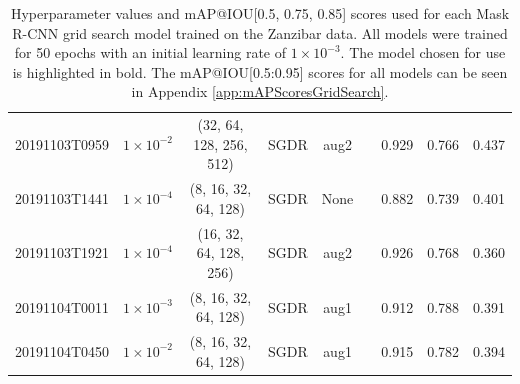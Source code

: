 \begin{table}[!ht]
\begin{adjustbox}{width=\columnwidth, center}
\begin{tabular}{ccccccccc}
			20191103T0959                        & $1\times10^{-2}$                                   & (32, 64, 128, 256, 512)                     & SGDR                                & aug2                                                                                      & \cmark                                                                                     & 0.929          & 0.766          & 0.437          \\
			20191103T1441                        & $1\times10^{-4}$                                 & (8, 16, 32, 64, 128)                        & SGDR                                & None                                                                                      & \cmark                                                                                     & 0.882          & 0.739          & 0.401          \\
			20191103T1921                        & $1\times10^{-4}$                                 & (16, 32, 64, 128, 256)                      & SGDR                                & aug2                                                                                      & \cmark                                                                                     & 0.926          & 0.768          & 0.360          \\
			20191104T0011                        & $1\times10^{-3}$                                  & (8, 16, 32, 64, 128)                        & SGDR                                & aug1                                                                                      & \cmark                                                                                     & 0.912          & 0.788          & 0.391          \\
			20191104T0450                        & $1\times10^{-2}$                                   & (8, 16, 32, 64, 128)                        & SGDR                                & aug1                                                                                      & \cmark                                                                                     & 0.915          & 0.782          & 0.394          \\ \hline
		\end{tabular}
	\end{adjustbox}
	\caption[Hyperparameter values and mAP@IOU{[}0.5, 0.75, 0.85{]} scores used for each Mask R-CNN grid search model trained on the Zanzibar data.]{Hyperparameter values and mAP@IOU{[}0.5, 0.75, 0.85{]} scores used for each Mask R-CNN grid search model trained on the Zanzibar data. All models were trained for 50 epochs with an initial learning rate of $1\times10^{-3}$. The model chosen for use is highlighted in bold. The mAP@IOU{[}0.5:0.95{]} scores for all models can be seen in Appendix \ref{app:mAPScoresGridSearch}.}\label{tab:MaskRCNNHyperparamTuningGridSearch}
\end{table}

